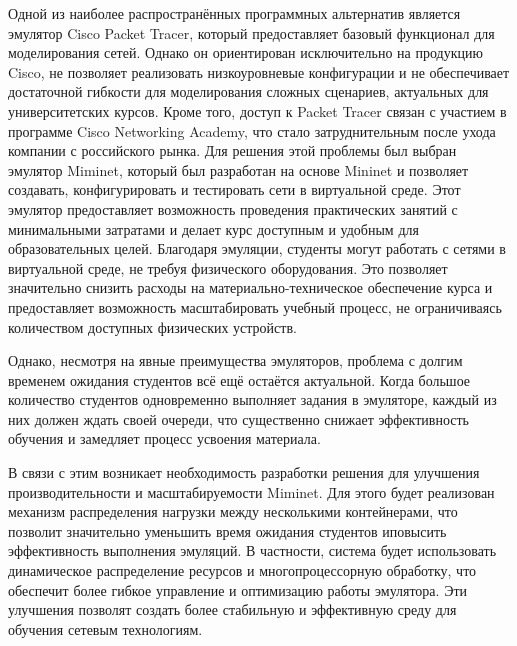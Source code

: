 Одной из наиболее распространённых программных альтернатив является эмулятор Cisco Packet Tracer, который предоставляет базовый функционал для моделирования сетей. Однако он ориентирован исключительно на продукцию Cisco, не позволяет реализовать низкоуровневые конфигурации и не обеспечивает достаточной гибкости для моделирования сложных сценариев, актуальных для университетских курсов. Кроме того, доступ к Packet Tracer связан с участием в программе Cisco Networking Academy, что стало затруднительным после ухода компании с российского рынка.
Для решения этой проблемы был выбран эмулятор Miminet, который был разработан на основе Mininet и позволяет создавать, конфигурировать и тестировать сети в виртуальной среде.
Этот эмулятор предоставляет возможность проведения практических занятий с минимальными затратами и делает курс доступным и удобным для образовательных целей.
Благодаря эмуляции, студенты могут работать с сетями в виртуальной среде, не требуя физического оборудования.
Это позволяет значительно снизить расходы на материально-техническое обеспечение курса и предоставляет возможность масштабировать учебный процесс, не ограничиваясь количеством доступных физических устройств.

Однако, несмотря на явные преимущества эмуляторов, проблема с долгим временем ожидания студентов всё ещё остаётся актуальной. Когда большое количество студентов одновременно выполняет задания в эмуляторе, каждый из них должен ждать своей очереди, что существенно снижает эффективность обучения и замедляет процесс усвоения материала.

В связи с этим возникает необходимость разработки решения для улучшения производительности и масштабируемости Miminet\cite{miminet}.
Для этого будет реализован механизм распределения нагрузки между несколькими контейнерами, что позволит значительно уменьшить время ожидания студентов иповысить эффективность выполнения эмуляций.
В частности, система будет использовать динамическое распределение ресурсов и многопроцессорную обработку, что обеспечит более гибкое управление и оптимизацию работы эмулятора.
Эти улучшения позволят создать более стабильную и эффективную среду для обучения сетевым технологиям.
